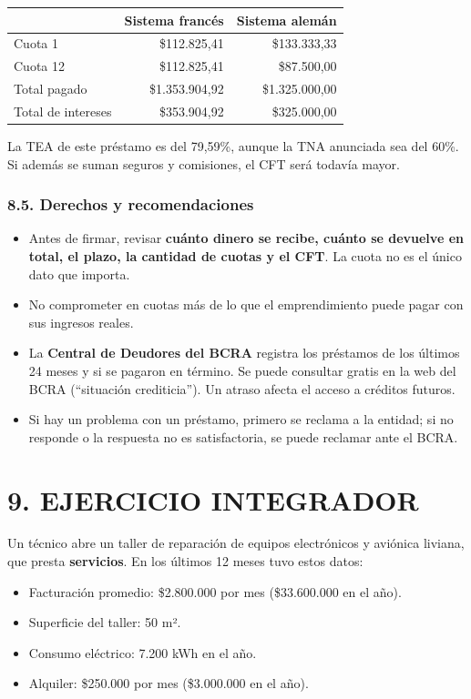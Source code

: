 \begin{center}
\small
\begin{tabular}{|l|r|r|}
\hline
 & \textbf{Sistema francés} & \textbf{Sistema alemán} \\ \hline
Cuota 1 & \$112.825,41 & \$133.333,33 \\ \hline
Cuota 12 & \$112.825,41 & \$87.500,00 \\ \hline
Total pagado & \$1.353.904,92 & \$1.325.000,00 \\ \hline
Total de intereses & \$353.904,92 & \$325.000,00 \\ \hline
\end{tabular}
\end{center}
La TEA de este préstamo es del 79,59\%, aunque la TNA anunciada sea del 60\%. Si además se
suman seguros y comisiones, el CFT será todavía mayor.

\subsubsection*{8.5. Derechos y recomendaciones}
\begin{itemize}
  \item Antes de firmar, revisar \textbf{cuánto dinero se recibe, cuánto se devuelve en
        total, el plazo, la cantidad de cuotas y el CFT}. La cuota no es el único dato que
        importa.
  \item No comprometer en cuotas más de lo que el emprendimiento puede pagar con sus
        ingresos reales.
  \item La \textbf{Central de Deudores del BCRA} registra los préstamos de los últimos 24
        meses y si se pagaron en término. Se puede consultar gratis en la web del BCRA
        (``situación crediticia''). Un atraso afecta el acceso a créditos futuros.
  \item Si hay un problema con un préstamo, primero se reclama a la entidad; si no responde
        o la respuesta no es satisfactoria, se puede reclamar ante el BCRA.
\end{itemize}

\section*{9. EJERCICIO INTEGRADOR}

Un técnico abre un taller de reparación de equipos electrónicos y aviónica liviana, que
presta \textbf{servicios}. En los últimos 12 meses tuvo estos datos:
\begin{itemize}
  \item Facturación promedio: \$2.800.000 por mes (\$33.600.000 en el año).
  \item Superficie del taller: 50 m².
  \item Consumo eléctrico: 7.200 kWh en el año.
  \item Alquiler: \$250.000 por mes (\$3.000.000 en el año).
\end{itemize}

